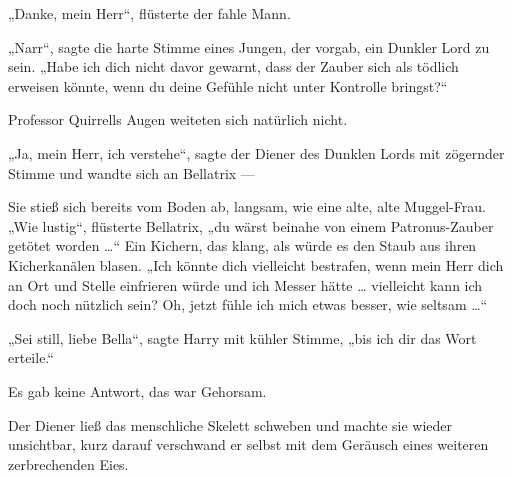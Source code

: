 „Danke, mein Herr“, flüsterte der fahle Mann.

„Narr“, sagte die harte Stimme eines Jungen, der vorgab, ein Dunkler Lord zu sein.
„Habe ich dich nicht davor gewarnt, dass der Zauber sich als tödlich erweisen könnte, wenn du deine Gefühle nicht unter Kontrolle bringst?“

Professor Quirrells Augen weiteten sich natürlich nicht.

„Ja, mein Herr, ich verstehe“, sagte der Diener des Dunklen Lords mit zögernder Stimme und wandte sich an Bellatrix —

Sie stieß sich bereits vom Boden ab, langsam, wie eine alte, alte Muggel-Frau.
„Wie lustig“, flüsterte Bellatrix, „du wärst beinahe von einem Patronus-Zauber getötet worden …“ Ein Kichern, das klang, als würde es den Staub aus ihren Kicherkanälen blasen.
„Ich könnte dich vielleicht bestrafen, wenn mein Herr dich an Ort und Stelle einfrieren würde und ich Messer hätte … vielleicht kann ich doch noch nützlich sein? Oh, jetzt fühle ich mich etwas besser, wie seltsam …“

„Sei still, liebe Bella“, sagte Harry mit kühler Stimme, „bis ich dir das Wort erteile.“

Es gab keine Antwort, das war Gehorsam.

Der Diener ließ das menschliche Skelett schweben und machte sie wieder unsichtbar, kurz darauf verschwand er selbst mit dem Geräusch eines weiteren zerbrechenden Eies.

